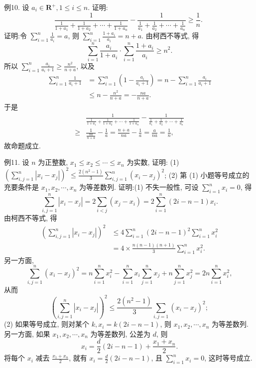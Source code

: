 例10. 设 $a_i \in \mathbf{R}^{+}, 1 \leqslant i \leqslant n$. 证明:
$$
\frac{1}{\frac{1}{1+a_1}+\frac{1}{1+a_2}+\cdots+\frac{1}{1+a_n}}-\frac{1}{\frac{1}{a_1}+\frac{1}{a_2}+\cdots+\frac{1}{a_n}} \geqslant \frac{1}{n} \text {. }
$$
证明:令 $\sum_{i=1}^n \frac{1}{a_i}=a$, 则 $\sum_{i=1}^n \frac{1+a_i}{a_i}=n+a$. 由柯西不等式, 得
$$
\sum_{i=1}^n \frac{a_i}{1+a_i} \cdot \sum_{i=1}^n \frac{1+a_i}{a_i} \geqslant n^2 .
$$
所以 $\sum_{i=1}^n \frac{a_i}{a_i+1} \geqslant \frac{n^2}{n+a}$, 以及
$$
\begin{aligned}
\sum_{i=1}^n \frac{1}{a_i+1} & =\sum_{i=1}^n\left(1-\frac{a_i}{a_i+1}\right)=n-\sum_{i=1}^n \frac{a_i}{a_i+1} \\
& \leqslant n-\frac{n^2}{n+a}=-\frac{n a}{n+a} .
\end{aligned}
$$
于是
$$
\begin{aligned}
& \frac{1}{\frac{1}{1+a_1}+\frac{1}{1+a_2}+\cdots+\frac{1}{1+a_n}}-\frac{1}{\frac{1}{a_1}+\frac{1}{a_2}+\cdots+\frac{1}{a_n}} \\
\geqslant & \frac{1}{\frac{n a}{n+a}}-\frac{1}{a}=\frac{n+a}{n a}-\frac{1}{a}=\frac{a}{n a}=\frac{1}{n},
\end{aligned}
$$
故命题成立.



例11. 设 $n$ 为正整数, $x_1 \leqslant x_2 \leqslant \cdots \leqslant x_n$ 为实数, 证明:
(1) $\left(\sum_{i, j=1}^n\left|x_i-x_j\right|\right)^2 \leqslant \frac{2\left(n^2-1\right)}{3} \sum_{i, j=1}^n\left(x_i-x_j\right)^2$;
(2) 第 (1) 小题等号成立的充要条件是 $x_1, x_2, \cdots, x_n$ 为等差数列.
证明:(1) 不失一般性, 可设 $\sum_{i=1}^n x_i=0$, 得
$$
\sum_{i, j=1}^n\left|x_i-x_j\right|=2 \sum_{i<j}\left(x_j-x_i\right)=2 \sum_{i=1}^n(2 i-n-1) x_i .
$$
由柯西不等式, 得
$$
\begin{aligned}
\left(\sum_{i, j=1}^n\left|x_i-x_j\right|\right)^2 & \leqslant 4 \sum_{i=1}^n(2 i-n-1)^2 \sum_{i=1}^n x_i^2 \\
& =4 \times \frac{n(n-1)(n+1)}{3} \sum_{i=1}^n x_i^2 .
\end{aligned}
$$
另一方面,
$$
\sum_{i, j=1}^n\left(x_i-x_j\right)^2=n \sum_{i=1}^n x_i^2-\sum_{i=1}^n x_i \sum_{j=1}^n x_j+n \sum_{j=1}^n x_j^2=2 n \sum_{i=1}^n x_i^2,
$$
从而
$$
\left(\sum_{i, j=1}^n\left|x_i-x_j\right|\right)^2 \leqslant \frac{2\left(n^2-1\right)}{3} \sum_{i, j=1}\left(x_i-x_j\right)^2 ;
$$
(2) 如果等号成立, 则对某个 $k, x_i=k(2 i-n-1)$, 则 $x_1, x_2, \cdots, x_n$ 为等差数列.
另一方面, 如果 $x_1, x_2, \cdots, x_n$ 为等差数列, 公差为 $d$, 则
$$
x_i=\frac{d}{2}(2 i-n-1)+\frac{x_1+x_n}{2} .
$$
将每个 $x_i$ 减去 $\frac{x_1+x_n}{2}$, 就有 $x_i=\frac{d}{2}(2 i-n-1)$, 且 $\sum_{i=1}^n x_i=0$, 这时等号成立.



